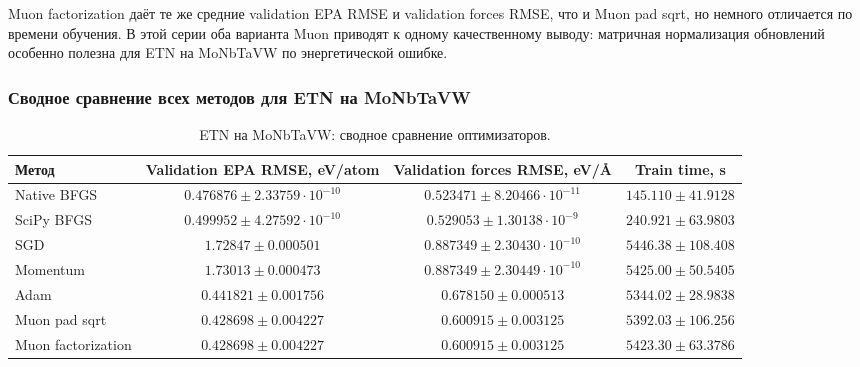 
Muon factorization даёт те же средние validation EPA RMSE и validation forces RMSE, что и Muon pad sqrt, но немного отличается по времени обучения. В этой серии оба варианта Muon приводят к одному качественному выводу: матричная нормализация обновлений особенно полезна для ETN на MoNbTaVW по энергетической ошибке.

\FloatBarrier

\subsubsection{Сводное сравнение всех методов для ETN на MoNbTaVW}

\begin{table}[H]
\centering
\small
\caption{ETN на MoNbTaVW: сводное сравнение оптимизаторов.}
\label{tab:etn-monbtavw-summary}
\begingroup
\setlength{\tabcolsep}{2.5pt}
\begin{tabular}{@{}lccc@{}}
\toprule
Метод & Validation EPA RMSE, eV/atom & Validation forces RMSE, eV/\AA & Train time, s \\
\midrule
Native BFGS & \(0.476876 \pm 2.33759\cdot 10^{-10}\) & \(0.523471 \pm 8.20466\cdot 10^{-11}\) & \(145.110 \pm 41.9128\) \\
SciPy BFGS & \(0.499952 \pm 4.27592\cdot 10^{-10}\) & \(0.529053 \pm 1.30138\cdot 10^{-9}\) & \(240.921 \pm 63.9803\) \\
SGD & \(1.72847 \pm 0.000501\) & \(0.887349 \pm 2.30430\cdot 10^{-10}\) & \(5446.38 \pm 108.408\) \\
Momentum & \(1.73013 \pm 0.000473\) & \(0.887349 \pm 2.30449\cdot 10^{-10}\) & \(5425.00 \pm 50.5405\) \\
Adam & \(0.441821 \pm 0.001756\) & \(0.678150 \pm 0.000513\) & \(5344.02 \pm 28.9838\) \\
Muon pad sqrt & \(0.428698 \pm 0.004227\) & \(0.600915 \pm 0.003125\) & \(5392.03 \pm 106.256\) \\
Muon factorization & \(0.428698 \pm 0.004227\) & \(0.600915 \pm 0.003125\) & \(5423.30 \pm 63.3786\) \\
\bottomrule
\end{tabular}
\endgroup
\end{table}


